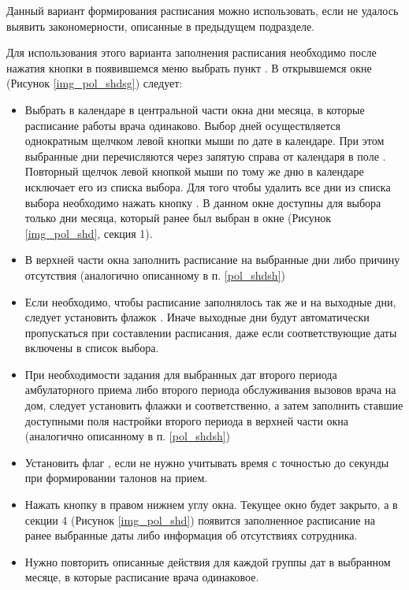 Данный вариант формирования расписания можно использовать, если не удалось выявить закономерности, описанные в предыдущем подразделе.

Для использования этого варианта заполнения расписания необходимо после нажатия кнопки   в появившемся меню выбрать пункт . В открывшемся окне  (Рисунок \ref{img_pol_shdsg}) следует:
\begin{itemize}
 \item Выбрать в календаре в центральной части окна дни месяца, в которые расписание работы врача одинаково. Выбор дней осуществляется однократным щелчком левой кнопки мыши по дате в календаре. При этом выбранные дни перечисляются через запятую справа от календаря в поле . Повторный щелчок левой кнопкой мыши по тому же дню в календаре исключает его из списка выбора. Для того чтобы удалить все дни из списка выбора необходимо нажать кнопку . В данном окне доступны для выбора только дни месяца, который ранее был выбран в окне  (Рисунок \ref{img_pol_shd}, секция 1).
 \item В верхней части окна заполнить расписание на выбранные дни либо причину отсутствия (аналогично описанному в п. \ref{pol_shdsh})
 \item Если необходимо, чтобы расписание заполнялось так же и на выходные дни, следует установить флажок . Иначе выходные дни будут автоматически пропускаться при составлении расписания, даже если соответствующие даты включены в список выбора.
 \item При необходимости задания для выбранных дат второго периода амбулаторного приема либо второго периода обслуживания вызовов врача на дом, следует установить флажки  и  соответственно, а затем заполнить ставшие доступными поля настройки второго периода в верхней части окна (аналогично описанному в п. \ref{pol_shdsh})
 \item Установить флаг , если не нужно учитывать время с точностью до секунды при формировании талонов на прием.
 \item Нажать кнопку  в правом нижнем углу окна. Текущее окно будет закрыто, а в секции 4 (Рисунок \ref{img_pol_shd}) появится заполненное расписание на ранее выбранные даты либо информация об отсутствиях сотрудника.
 \item Нужно повторить описанные действия для каждой группы дат в выбранном месяце, в которые расписание врача одинаковое.
\end{itemize}

